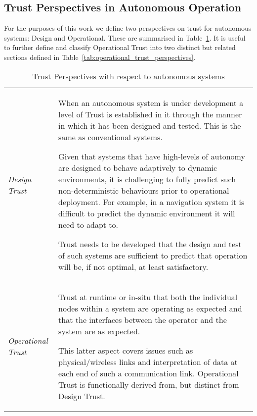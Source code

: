 \subsection{Trust Perspectives in Autonomous Operation}
For the purposes of this work we define two perspectives on trust for autonomous systems: Design and Operational.
These are summarised in Table~\ref{tab:trust_perspectives}.
It is useful to further define and classify Operational Trust into two distinct but related sections defined in Table~\ref{tab:operational_trust_perspectives}.
\begin{table}
  \begin{tabularx}{\textwidth}{p{3cm}X}\toprule
    \emph{Design Trust} & When an autonomous system is under development a level of Trust is established in it through the manner in which it has been designed and tested.
    This is the same as conventional systems.\par
    Given that systems that have high-levels of autonomy are designed to behave adaptively to dynamic environments, it is challenging to fully predict such non-deterministic behaviours prior to operational deployment.
    For example, in a navigation system it is difficult to predict the dynamic environment it will need to adapt to.\par
    Trust needs to be developed that the design and test of such systems are sufficient to predict that operation will be, if not optimal, at least satisfactory.
    \\
    \emph{Operational Trust} & Trust at runtime or in-situ that both the individual nodes within a system are operating as expected and that the interfaces between the operator and the system are as expected.
    \par
    This latter aspect covers issues such as physical/wireless links and interpretation of data at each end of such a communication link.
    Operational Trust is functionally derived from, but distinct from Design Trust.\\
    \bottomrule
  \end{tabularx}
  \caption{Trust Perspectives with respect to autonomous systems}
  \label{tab:trust_perspectives}
\end{table}
%
